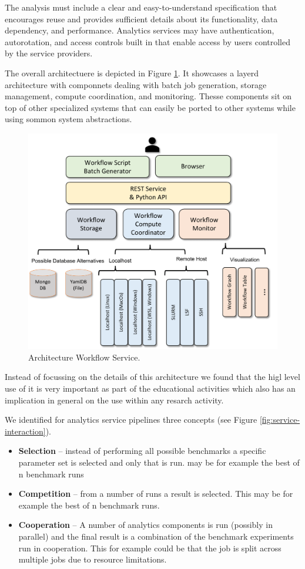 \documentclass[utf8]{FrontiersinVancouver} %
\begin{document}
The analysis must include a clear and easy-to-understand specification
that encourages reuse and provides sufficient details about its
functionality, data dependency, and performance. Analytics services
may have authentication, autorotation, and access controls built in
that enable access by users controlled by the service providers.

The overall architectuere is depicted in Figure \ref{fig:cc-2}. It
showcases a layerd architecture with componnets dealing with batch job
generation, storage management, compute coordination, and
monitoring. Thesse components sit on top of other specialized systems
that can easily be ported to other systems while using sommon system
abstractions.

\begin{figure}[htb]
    \centering
    \includegraphics[width=0.50\columnwidth]{images/cloudmesh-cc-new.pdf}
    \caption{Architecture Workflow Service.}
    \label{fig:cc-2}
\end{figure}


Instead of focussing on the details of this architecture we found that
the higl level use of it is very important as part of the educational
activities which also has an implication in general on the use within
any resarch activity.

We identified for analytics service pipelines
three concepts (see Figure \ref{fig:service-interaction}).

\begin{itemize}
\item {\bf Selection} -- instead of performing all possible benchmarks a
  specific parameter set is selected and only that is run.  may be for
  example the best of n benchmark runs
\item {\bf Competition} -- from a number of runs a result is selected. This
  may be for example the best of n benchmark runs.
\item {\bf Cooperation} -- A number of analytics components is run
  (possibly in parallel) and the final result is a combination of the
  benchmark experiments run in cooperation. This for example could be
  that the job is split across multiple jobs due to resource
  limitations.
\end{itemize}
\end{document}

